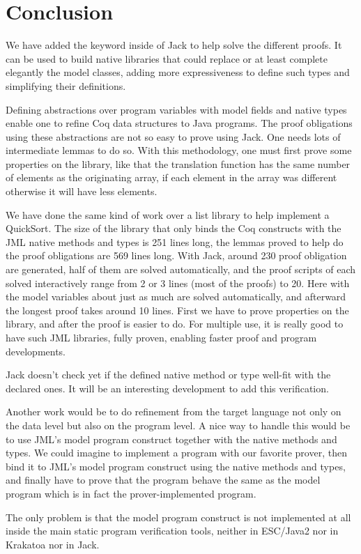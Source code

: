 \section{Conclusion}
We have added the  keyword inside of Jack to help solve the different 
proofs. It can be used to build  native libraries that could replace or 
at least complete elegantly the model classes, adding more expressiveness
to define such types and  simplifying their definitions.

Defining abstractions over program variables with model fields and native types
 enable one to refine Coq data structures to Java programs. 
The proof obligations using these abstractions are not so easy to prove using Jack. 
One needs lots of intermediate lemmas to do so. 
With this methodology, one must first prove some properties on the library, 
like that the translation function  has the same number 
of elements as the originating array, if each element in the array
was different otherwise it will have less elements.

We have done the same kind of work over a list library to help implement a QuickSort. The size of the 
library that only binds the Coq constructs with the JML native methods and types is 251 lines long,
the lemmas proved to help do the proof obligations are 569 lines long. 
With Jack, around 230 proof obligation are generated, half of them are solved automatically, 
and the proof scripts of each solved interactively range from 2 or 3 lines (most of the proofs) to 20. 
Here with the model
variables about just as much are solved automatically, and afterward the longest proof takes around 
10 lines.
First we have to prove properties on the library, and after the proof is easier to do. 
For multiple use,
it is really good to have such JML libraries, fully proven, enabling faster proof and program developments.

Jack doesn't check yet if the defined native method or type well-fit with the declared ones.
It will be an interesting development to add this verification.


Another work would be to do  refinement from the 
target language not only on the data level but also on the program
level. A nice way to handle this would be to use JML's model program construct
together with the native methods and types. We could imagine 
to implement a program with our favorite prover, then bind it
to JML's model program construct using the native methods and types,
 and finally have to prove that the program behave the same
as the model program which is in fact the prover-implemented program.

The only problem is that the model program construct is not implemented at
all inside the main static program verification tools, neither in ESC/Java2 nor
 in Krakatoa nor in Jack. 




